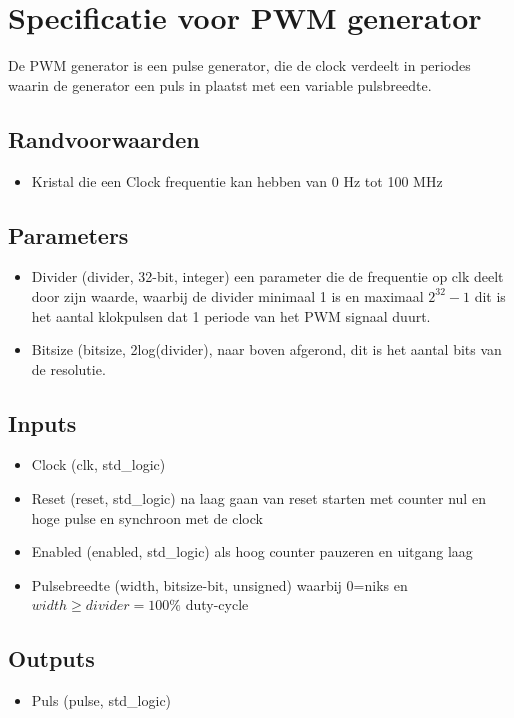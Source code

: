 \documentclass{article}
\begin{document}
\section{Specificatie voor PWM generator}
De PWM generator is een pulse generator, die de clock verdeelt in periodes waarin de generator een puls in plaatst met een variable pulsbreedte.
\subsection{Randvoorwaarden}
\begin{itemize}
\item Kristal die een Clock frequentie kan hebben van 0 Hz tot 100 MHz 
\end{itemize}
\subsection{Parameters}
\begin{itemize}
\item Divider (divider, 32-bit, integer) een parameter die de frequentie op clk deelt door zijn waarde, waarbij de divider minimaal 1 is en maximaal $2^{32} -1$ dit is het aantal klokpulsen dat 1 periode van het PWM signaal duurt.
\item Bitsize  (bitsize, 2log(divider), naar boven afgerond, dit is het aantal bits van de resolutie.

\end{itemize}
\subsection{Inputs}
\begin{itemize}
\item Clock (clk, std\_logic)
\item Reset (reset, std\_logic) na laag gaan van reset starten met counter nul en hoge pulse en synchroon met de clock
\item Enabled (enabled, std\_logic) als hoog counter pauzeren en uitgang laag
\item Pulsebreedte (width, bitsize-bit, unsigned) waarbij 0=niks en $width \geq divider = 100\%$ duty-cycle
\end{itemize}
\subsection{Outputs}
\begin{itemize}
\item Puls (pulse, std\_logic)
\end{itemize}
\end{document}

